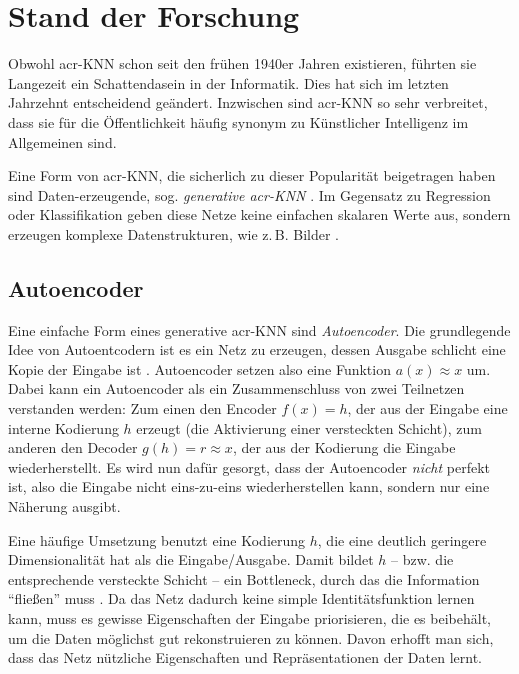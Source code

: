 \chapter{Stand der Forschung}\label{chp:forschungsstand} %
\glsresetall

Obwohl \gls{acr-KNN} schon seit den frühen 1940er Jahren existieren, führten sie
Langezeit ein Schattendasein in der Informatik. Dies hat sich im letzten
Jahrzehnt entscheidend geändert. Inzwischen sind \gls{acr-KNN} so sehr
verbreitet, dass sie für die Öffentlichkeit häufig synonym zu Künstlicher
Intelligenz im Allgemeinen sind.

Eine Form von \gls{acr-KNN}, die
sicherlich zu dieser Popularität beigetragen haben sind Daten-erzeugende, sog.
\emph{generative \gls{acr-KNN}} \cite{goodfellow2014generative,
kingma2019introduction}. Im Gegensatz zu Regression oder Klassifikation geben
diese Netze keine einfachen skalaren Werte aus, sondern erzeugen komplexe
Datenstrukturen, wie z.\,B. Bilder \cite[S. 100ff.]{goodfellow2016deep}.

\section{Autoencoder}

Eine einfache Form eines generative \gls{acr-KNN} sind
\emph{Autoencoder}. Die grundlegende Idee von Autoentcodern ist es ein Netz zu
erzeugen, dessen Ausgabe schlicht eine Kopie der Eingabe ist \cite[S.
502]{goodfellow2016deep}. Autoencoder setzen also eine Funktion $a(x) \approx x$
um. Dabei kann ein Autoencoder als ein Zusammenschluss von zwei Teilnetzen
verstanden werden: Zum einen den Encoder $f(x) = h$, der aus der Eingabe eine
interne Kodierung $h$ erzeugt (die Aktivierung einer versteckten Schicht), zum
anderen den Decoder $g(h) = r \approx x$, der aus der Kodierung die Eingabe
wiederherstellt. Es wird nun dafür gesorgt, dass der Autoencoder \emph{nicht}
perfekt ist, also die Eingabe nicht eins-zu-eins wiederherstellen kann, sondern
nur eine Näherung ausgibt.

Eine häufige Umsetzung benutzt eine Kodierung $h$,
die eine deutlich geringere Dimensionalität hat als die Eingabe/Ausgabe. Damit
bildet $h$ – bzw. die entsprechende versteckte Schicht – ein Bottleneck, durch das
die Information \enquote{fließen} muss \cites[S.503]{goodfellow2016deep}[S. 620f.]{raschka2019}. Da das Netz dadurch keine simple
Identitätsfunktion lernen kann, muss es gewisse Eigenschaften der Eingabe
priorisieren, die es beibehält, um die Daten möglichst gut rekonstruieren zu können.
Davon erhofft man sich, dass das Netz nützliche Eigenschaften und
Repräsentationen der Daten lernt.

